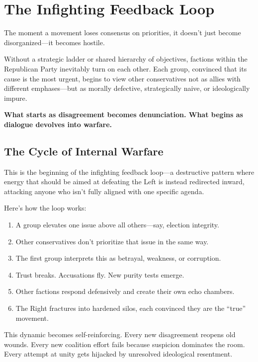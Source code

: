 \section{The Infighting Feedback Loop}

The moment a movement loses consensus on priorities, it doesn’t just become disorganized—it becomes hostile.

Without a strategic ladder or shared hierarchy of objectives, factions within the Republican Party inevitably turn on each other. Each group, convinced that its cause is the most urgent, begins to view other conservatives not as allies with different emphases—but as morally defective, strategically naive, or ideologically impure.

\textbf{What starts as disagreement becomes denunciation. What begins as dialogue devolves into warfare.}

\subsection*{The Cycle of Internal Warfare}

This is the beginning of the infighting feedback loop—a destructive pattern where energy that should be aimed at defeating the Left is instead redirected inward, attacking anyone who isn’t fully aligned with one specific agenda.

Here’s how the loop works:

\begin{enumerate}
    \item A group elevates one issue above all others—say, election integrity.
    \item Other conservatives don’t prioritize that issue in the same way.
    \item The first group interprets this as betrayal, weakness, or corruption.
    \item Trust breaks. Accusations fly. New purity tests emerge.
    \item Other factions respond defensively and create their own echo chambers.
    \item The Right fractures into hardened silos, each convinced they are the “true” movement.
\end{enumerate}

This dynamic becomes self-reinforcing. Every new disagreement reopens old wounds. Every new coalition effort fails because suspicion dominates the room. Every attempt at unity gets hijacked by unresolved ideological resentment.

